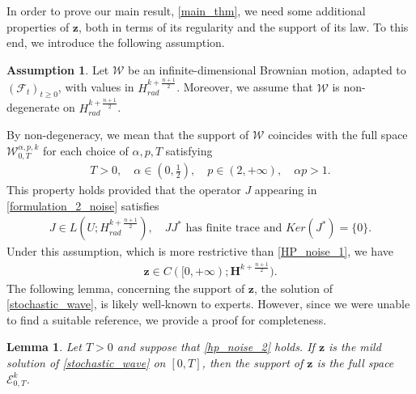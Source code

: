 \documentclass[12pt,reqno]{amsart}
\theoremstyle{plain}
\theoremstyle{remark}
\theoremstyle{plain}
\newtheorem{lemma}[theorem]{Lemma}
\theoremstyle{definition}
\newtheorem{assumption}[theorem]{Assumption}
\numberwithin{equation}{section}
\numberwithin{equation}{section}
\begin{document}
	In order to prove our main result, \autoref{main_thm}, we need some additional properties of $\mathbf{z}$, both in terms of its regularity and the support of its law. To this end, we introduce the following assumption.
	\begin{assumption}\label{hp_noise_2}
		Let $\mathcal{W}$ be an infinite-dimensional Brownian motion, adapted to $(\mathcal{F}_t)_{t\ge 0}$, with values in $H^{k+\frac{n+1}{2}}_{rad}$. Moreover, we assume that $\mathcal{W}$ is non-degenerate on $H^{k+\frac{n+1}{2}}_{rad}$.
	\end{assumption}
	By non-degeneracy, we mean that the support of $\mathcal{W}$ coincides with the full space $\mathcal{W}^{\alpha,p,k}_{0,T}$ for each choice of $\alpha,p,T$ satisfying \begin{align*}
	    T>0,\quad \alpha\in (0,\frac{1}{2}),\quad p\in (2,+\infty),\quad \alpha p>1.
	\end{align*} This property holds provided that the operator $J$ appearing in \eqref{formulation_2_noise} satisfies \begin{align*}
	    J\in L(U;H^{k+\frac{n+1}{2}}_{rad}),\quad JJ^* \text{ has finite trace and } Ker(J^*)=\{0\}.
	\end{align*} Under this assumption, which is more restrictive than \autoref{HP_noise_1}, we have  
    \begin{align*}
	    \mathbf{z}\in C([0,+\infty);\mathbf{H}^{k+\frac{n+1}{2}}).
	\end{align*}
	The following lemma, concerning the support of $\mathbf{z}$, the solution of \eqref{stochastic_wave}, is likely well-known to experts. However, since we were unable to find a suitable reference, we provide a proof for completeness.
	\begin{lemma}\label{lemma_support_z}
		Let $T>0$ and suppose that \autoref{hp_noise_2} holds. If $\mathbf{z}$ is the mild solution of \eqref{stochastic_wave} on $[0,T]$, then the support of $\mathbf{z}$ is the full space $\mathcal{E}_{0,T}^k$.
	\end{lemma}
\end{document}
